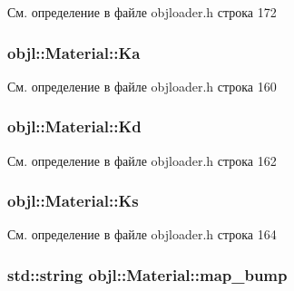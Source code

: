 См. определение в файле objloader.\+h строка 172

\subsubsection[{\texorpdfstring{Ka}{Ka}}]{ objl\+::\+Material\+::\+Ka}\hypertarget{structobjl_1_1_material_a13c3660fd7fc3924f7811c46ca3f1272}{}\label{structobjl_1_1_material_a13c3660fd7fc3924f7811c46ca3f1272}


См. определение в файле objloader.\+h строка 160

\subsubsection[{\texorpdfstring{Kd}{Kd}}]{ objl\+::\+Material\+::\+Kd}\hypertarget{structobjl_1_1_material_a16b7219d2d20e5f7a58e14f68b663a98}{}\label{structobjl_1_1_material_a16b7219d2d20e5f7a58e14f68b663a98}


См. определение в файле objloader.\+h строка 162

\subsubsection[{\texorpdfstring{Ks}{Ks}}]{ objl\+::\+Material\+::\+Ks}\hypertarget{structobjl_1_1_material_ac1298eff05de5020120a143f21058b83}{}\label{structobjl_1_1_material_ac1298eff05de5020120a143f21058b83}


См. определение в файле objloader.\+h строка 164

\subsubsection[{\texorpdfstring{map\+\_\+bump}{map_bump}}]{\setlength{\rightskip}{0pt plus 5cm}std\+::string objl\+::\+Material\+::map\+\_\+bump}\hypertarget{structobjl_1_1_material_af4e42567a2077c6e165f95403fc06c20}{}\label{structobjl_1_1_material_af4e42567a2077c6e165f95403fc06c20}


